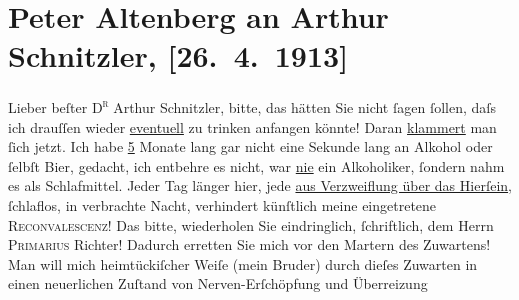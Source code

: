 

               \section[Peter Altenberg an Arthur Schnitzler, {[}26. 4. 1913{]}]{ Peter Altenberg an Arthur Schnitzler, {[}26. 4. 1913{]}}\nopagebreak{}\rehead{ }\begin{ledgroupsized}[t]{13cm}\normalsize\beginnumbering{} \toendnotes[C]{\smallbreak\pagebreak[2]} 
\toendnotes[C]{\smallbreak}\pstart{}{\pb}Lieber beſter \textsc{D\textsuperscript{r}} Arthur Schnitzler,\pend\pstart
           bitte, das hätten Sie nicht ſagen ſollen, daſs ich drauſſen wieder \uline{eventuell} zu trinken anfangen könnte! Daran \uline{klammert} man ſich jetzt. Ich habe \uline{5} Monate lang gar
                    nicht eine Sekunde lang an Alkohol oder ſelbſt Bier, gedacht, ich entbehre es
                    nicht, war \uline{nie} ein Alkoholiker, ſondern nahm es
                    als Schlafmittel.\pend
           \pstart
           Jeder Tag länger hier, jede \uline{aus Verzweiflung über das
                        Hierſein}, ſchlaflos, in 
                    verbrachte Nacht, verhindert künſtlich meine eingetretene {\pb}\textsc{Reconvalescenz}! Das bitte, wiederholen Sie
                    eindringlich, ſchriftlich, dem Herrn \textsc{Primarius}{ }Richter! Dadurch erretten Sie mich vor den
                    Martern des Zuwartens! Man will mich heimtückiſcher Weiſe (mein Bruder) durch dieſes
                    Zuwarten in einen neuerlichen Zuſtand von Nerven-Erſchöpfung und Überreizung

\end{ledgroupsized}
